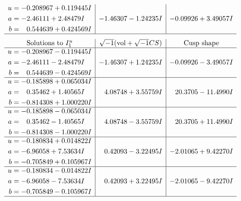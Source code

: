 \documentclass[1p]{elsarticle_modified}
\theoremstyle{definition}
\newcommand{\I}{\sqrt{-1}}
\begin{document}
$$\begin{array}{c|c|c}
\begin{aligned}
u &= -0.208967 + 0.119445 I \\
a &= -2.46111 + 2.48479 I \\
b &= \phantom{-}0.544639 + 0.424569 I\end{aligned}
 & -1.46307 - 1.24235 I & -0.09926 + 3.49057 I\\
 \hline 
 \end{array}$$\newpage$$\begin{array}{c|c|c}  
\text{Solutions to }I^u_{1}& \I (\text{vol} + \sqrt{-1}CS) & \text{Cusp shape}\\
 \hline 
\begin{aligned}
u &= -0.208967 - 0.119445 I \\
a &= -2.46111 - 2.48479 I \\
b &= \phantom{-}0.544639 - 0.424569 I\end{aligned}
 & -1.46307 + 1.24235 I & -0.09926 - 3.49057 I \\ \hline\begin{aligned}
u &= -0.185898 + 0.065034 I \\
a &= \phantom{-}0.35462 + 1.40565 I \\
b &= -0.814308 + 1.000220 I\end{aligned}
 & \phantom{-}4.08748 + 3.55759 I & \phantom{-}20.3705 - 11.4990 I \\ \hline\begin{aligned}
u &= -0.185898 - 0.065034 I \\
a &= \phantom{-}0.35462 - 1.40565 I \\
b &= -0.814308 - 1.000220 I\end{aligned}
 & \phantom{-}4.08748 - 3.55759 I & \phantom{-}20.3705 + 11.4990 I \\ \hline\begin{aligned}
u &= -0.180834 + 0.014822 I \\
a &= -6.96058 + 7.53634 I \\
b &= -0.705849 + 0.105967 I\end{aligned}
 & \phantom{-}0.42093 - 3.22495 I & -2.01065 + 9.42270 I \\ \hline\begin{aligned}
u &= -0.180834 - 0.014822 I \\
a &= -6.96058 - 7.53634 I \\
b &= -0.705849 - 0.105967 I\end{aligned}
 & \phantom{-}0.42093 + 3.22495 I & -2.01065 - 9.42270 I\\
 \hline 
 \end{array}$$\newpage\newpage\renewcommand{\arraystretch}{1}
\end{document}
